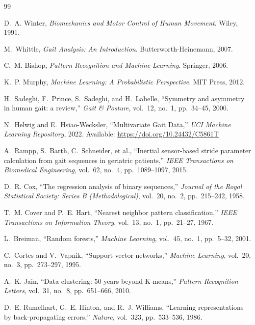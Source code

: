 \documentclass[journal]{IEEEtran}
\begin{document}
\begin{thebibliography}{99}

D.~A. Winter,
\emph{Biomechanics and Motor Control of Human Movement}.
Wiley, 1991.

M.~Whittle, \emph{Gait Analysis: An Introduction}. Butterworth-Heinemann, 2007.

C.~M. Bishop,
\emph{Pattern Recognition and Machine Learning}.
Springer, 2006.

K.~P. Murphy,
\emph{Machine Learning: A Probabilistic Perspective}.
MIT Press, 2012.

H.~Sadeghi, F.~Prince, S.~Sadeghi, and H.~Labelle,
``Symmetry and asymmetry in human gait: a review,''
\emph{Gait \& Posture}, vol.~12, no.~1, pp.~34--45, 2000.

N.~Helwig and E.~Hsiao-Wecksler,
``Multivariate Gait Data,''
\emph{UCI Machine Learning Repository},
2022. Available: \url{https://doi.org/10.24432/C5861T}

A.~Rampp, S.~Barth, C.~Schneider, et al., 
``Inertial sensor-based stride parameter calculation from gait sequences in geriatric patients,'' 
\emph{IEEE Transactions on Biomedical Engineering}, vol.~62, no.~4, pp.~1089--1097, 2015.

D.~R. Cox,
``The regression analysis of binary sequences,''
\emph{Journal of the Royal Statistical Society: Series B (Methodological)}, 
vol.~20, no.~2, pp.~215--242, 1958.

T.~M. Cover and P.~E. Hart,
``Nearest neighbor pattern classification,''
\emph{IEEE Transactions on Information Theory}, vol.~13, no.~1, pp.~21--27, 1967.

L.~Breiman, 
``Random forests,'' 
\emph{Machine Learning}, vol.~45, no.~1, pp.~5--32, 2001.

C.~Cortes and V.~Vapnik, 
``Support-vector networks,'' 
\emph{Machine Learning}, vol.~20, no.~3, pp.~273--297, 1995.

A.~K. Jain, 
``Data clustering: 50 years beyond K-means,'' 
\emph{Pattern Recognition Letters}, vol.~31, no.~8, pp.~651--666, 2010.

D.~E. Rumelhart, G.~E. Hinton, and R.~J. Williams, 
``Learning representations by back-propagating errors,'' 
\emph{Nature}, vol.~323, pp.~533--536, 1986.

\end{thebibliography}
\end{document}
